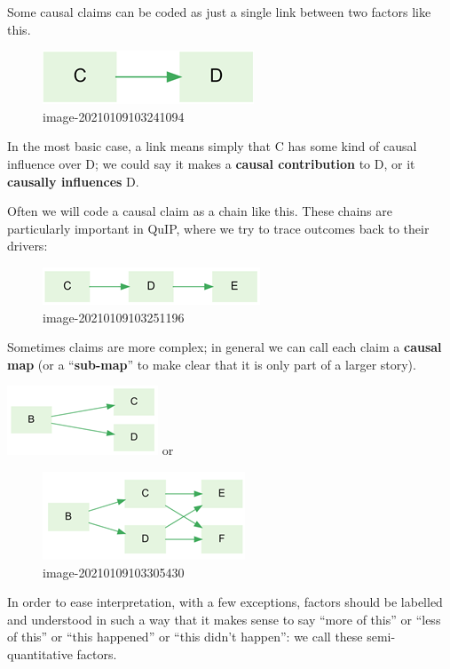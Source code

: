 \documentclass[
]{book}
\begin{document}
Some causal claims can be coded as just a single link between two factors like this.

\begin{figure}
\centering
\includegraphics{_assets/image-20210109103241094.png}
\caption{image-20210109103241094}
\end{figure}

In the most basic case, a link means simply that C has some kind of causal influence over D; we could say it makes a \textbf{causal contribution} to D, or it \textbf{causally influences} D.

Often we will code a causal claim as a chain like this. These chains are particularly important in QuIP, where we try to trace outcomes back to their drivers:

\begin{figure}
\centering
\includegraphics{_assets/image-20210109103251196.png}
\caption{image-20210109103251196}
\end{figure}

Sometimes claims are more complex; in general we can call each claim a \textbf{causal map} (or a ``\textbf{sub-map}'' to make clear that it is only part of a larger story).

\includegraphics{_assets/image-20210109103257743.png} or

\begin{figure}
\centering
\includegraphics{_assets/image-20210109103305430.png}
\caption{image-20210109103305430}
\end{figure}

In order to ease interpretation, with a few exceptions, factors should be labelled and understood in such a way that it makes sense to say ``more of this'' or ``less of this'' or ``this happened'' or ``this didn't happen'': we call these semi-quantitative factors.
\end{document}
